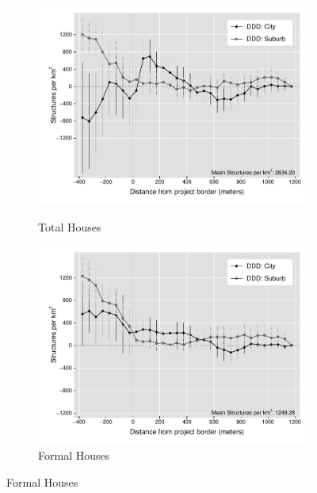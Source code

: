 \documentclass[12pt]{article}
\begin{document}
\begin{figure}[t!]
    \centering
    \vspace{2mm}
    \begin{subfigure}[b]{0.49\textwidth}
        \centering
        \caption[]{\small Total Houses}  
        \vspace{-1mm}
        \includegraphics[width=\textwidth,trim={.5cm .3cm .3cm 0cm}, clip=true]{figures/distplotDDD_bblu_total_buildings_admin_het_3}
        \label{fig:DDDtotal_het}
    \end{subfigure}
    \hfill
    \begin{subfigure}[b]{0.49\textwidth}  
        \centering 
        \caption[]{\small Formal Houses}
        \vspace{-1mm}
        \includegraphics[width=\textwidth,trim={.5cm .3cm .3cm 0cm}, clip=true]{figures/distplotDDD_bblu_for_admin_het_3}     

\end{subfigure}
\end{figure}
\end{document}
